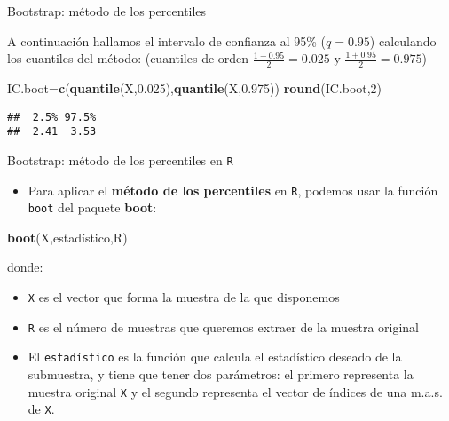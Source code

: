 \documentclass[ignorenonframetext,]{beamer}
\newenvironment{Shaded}{\begin{snugshade}}{\end{snugshade}}
\newcommand{\DecValTok}[1]{\textcolor[rgb]{0.00,0.00,0.81}{#1}}
\newcommand{\FloatTok}[1]{\textcolor[rgb]{0.00,0.00,0.81}{#1}}
\newcommand{\KeywordTok}[1]{\textcolor[rgb]{0.13,0.29,0.53}{\textbf{#1}}}
\newcommand{\NormalTok}[1]{#1}
\providecommand{\tightlist}{%
  \setlength{\itemsep}{0pt}\setlength{\parskip}{0pt}}
\begin{document}
\begin{frame}[fragile]{Bootstrap: método de los percentiles}
\protect\hypertarget{bootstrap-metodo-de-los-percentiles-2}{}

A continuación hallamos el intervalo de confianza al 95\% (\(q=0.95\))
calculando los cuantiles del método: (cuantiles de orden
\(\frac{1-0.95}{2}=0.025\) y \(\frac{1+0.95}{2}=0.975\))

\begin{Shaded}
\begin{Highlighting}[]
\NormalTok{IC.boot=}\KeywordTok{c}\NormalTok{(}\KeywordTok{quantile}\NormalTok{(X,}\FloatTok{0.025}\NormalTok{),}\KeywordTok{quantile}\NormalTok{(X,}\FloatTok{0.975}\NormalTok{))}
\KeywordTok{round}\NormalTok{(IC.boot,}\DecValTok{2}\NormalTok{)}
\end{Highlighting}
\end{Shaded}

\begin{verbatim}
##  2.5% 97.5% 
##  2.41  3.53
\end{verbatim}

\end{frame}

\begin{frame}[fragile]{Bootstrap: método de los percentiles en
\texttt{R}}
\protect\hypertarget{bootstrap-metodo-de-los-percentiles-en-r}{}

\begin{itemize}
\tightlist
\item
  Para aplicar el \textbf{método de los percentiles} en \texttt{R},
  podemos usar la función \texttt{boot} del paquete \textbf{boot}:
\end{itemize}

\begin{Shaded}
\begin{Highlighting}[]
\KeywordTok{boot}\NormalTok{(X,estadístico,R)}
\end{Highlighting}
\end{Shaded}

donde:

\begin{itemize}
\item
  \texttt{X} es el vector que forma la muestra de la que disponemos
\item
  \texttt{R} es el número de muestras que queremos extraer de la muestra
  original
\item
  El \texttt{estadístico} es la función que calcula el estadístico
  deseado de la submuestra, y tiene que tener dos parámetros: el primero
  representa la muestra original \texttt{X} y el segundo representa el
  vector de índices de una m.a.s. de \texttt{X}.
\end{itemize}

\end{frame}
\end{document}
